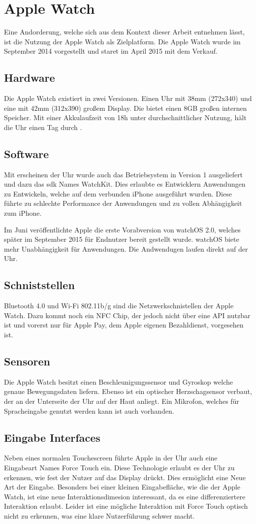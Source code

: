 \section{Apple Watch}
\label{ch:apple-watch}
Eine Andorderung, welche sich aus dem Kontext dieser Arbeit entnehmen lässt, ist die Nutzung der Apple Watch als Zielplatform. Die Apple Watch wurde im September 2014 vorgestellt und staret im April 2015 mit dem Verkauf.
\subsection{Hardware}
Die Apple Watch existiert in zwei Versionen. Einen Uhr mit 38mm (272x340) und eine mit 42mm (312x390) großem Display. Die bietet einen 8GB großen internen Speicher. Mit einer Akkulaufzeit von 18h unter durchschnittlicher Nutzung, hält die Uhr einen Tag durch \cite{Riches:2015aa}. 
\subsection{Software}
Mit erscheinen der Uhr wurde auch das Betriebsystem in Version 1 ausgeliefert und dazu das \gls{sdk} Names WatchKit. Dies erlaubte es Entwicklern Anwendungen zu Entwickeln, welche auf dem verbunden iPhone ausgeführt wurden. Diese führte zu schlechte Performance der Anwendungen und zu vollen Abhängigkeit zum iPhone.

Im Juni veröffentlichte Apple die erste Vorabversion von watchOS 2.0, welches später im September 2015 für Endnutzer bereit gestellt wurde. watchOS biete mehr Unabhängigkeit für Anwendungen. Die Andwendugen laufen direkt auf der Uhr.
\subsection{Schniststellen}
Bluetooth 4.0 und Wi-Fi 802.11b/g sind die Netzwerkschnistellen der Apple Watch. Dazu kommt noch ein NFC Chip, der jedoch nicht über eine API nutzbar ist und vorerst nur für Apple Pay, dem Apple eigenen Bezahldienst, vorgesehen ist\cite{RITCHIE:2015aa}. 
\subsection{Sensoren}
Die Apple Watch besitzt einen Beschleunigungssensor und Gyroskop welche genaue Bewegungsdaten liefern. Ebenso ist ein optischer Herzschagsensor verbaut, der an der Unterseite der Uhr auf der Haut anliegt. Ein Mikrofon, welches für Spracheingabe genutzt werden kann ist auch vorhanden.
\subsection{Eingabe Interfaces}
Neben eines normalen Touchescreen führte Apple in der Uhr auch eine Eingabeart Names Force Touch ein. Diese Technologie erlaubt es der Uhr zu erkennen, wie fest der Nutzer auf das Display drückt. Dies ermöglicht eine Neue Art der Eingabe. Besonders bei einer kleinen Eingabefläche, wie die der Apple Watch, ist eine neue Interaktionsdimesion interessant, da es eine differenziertere Interaktion erlaubt. Leider ist eine mögliche Interaktion mit Force Touch optisch nicht zu erkennen, was eine klare Nutzerführung schwer macht.


